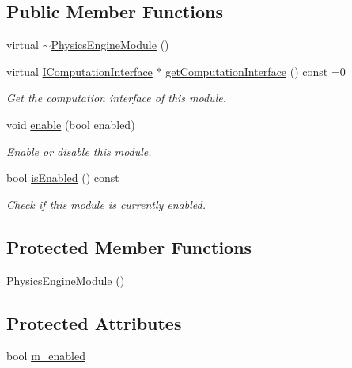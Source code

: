 \subsection*{Public Member Functions}
\begin{DoxyCompactItemize}
\item 
virtual \mbox{\hyperlink{classr3_1_1_physics_engine_module_af2b491daa564a15ec5362780c885e2ca}{$\sim$\+Physics\+Engine\+Module}} ()
\item 
virtual \mbox{\hyperlink{classr3_1_1_i_computation_interface}{I\+Computation\+Interface}} $\ast$ \mbox{\hyperlink{classr3_1_1_physics_engine_module_a3b1d0d9bea0a82534f367f6d728312d3}{get\+Computation\+Interface}} () const =0
\begin{DoxyCompactList}\small\item\em Get the computation interface of this module. \end{DoxyCompactList}\item 
void \mbox{\hyperlink{classr3_1_1_physics_engine_module_abaaace8d25ea23ed21ade61ca2b201d0}{enable}} (bool enabled)
\begin{DoxyCompactList}\small\item\em Enable or disable this module. \end{DoxyCompactList}\item 
bool \mbox{\hyperlink{classr3_1_1_physics_engine_module_add8b93ca3e3e3ec0ff045c15610119ea}{is\+Enabled}} () const
\begin{DoxyCompactList}\small\item\em Check if this module is currently enabled. \end{DoxyCompactList}\end{DoxyCompactItemize}
\subsection*{Protected Member Functions}
\begin{DoxyCompactItemize}
\item 
\mbox{\hyperlink{classr3_1_1_physics_engine_module_a37f69469023611b549a09c2afc23df20}{Physics\+Engine\+Module}} ()
\end{DoxyCompactItemize}
\subsection*{Protected Attributes}
\begin{DoxyCompactItemize}
\item 
bool \mbox{\hyperlink{classr3_1_1_physics_engine_module_a9697a77e77dc5dd5990b16876ad413bf}{m\+\_\+enabled}}
\end{DoxyCompactItemize}


